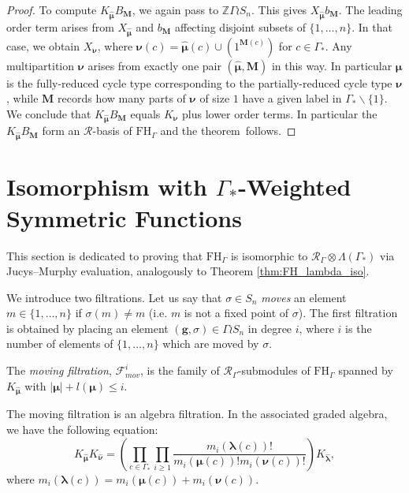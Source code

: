 \documentclass[ALCO,Unicode]{cedram}
\newcommand{\bs}{\boldsymbol}
\newcommand{\RGamma}{\mathcal{R}_{\Gamma}}
\newcommand{\LambdaG}{\Lambda(\Gamma_*)}
\newcommand{\FHG}{\mathrm{FH}_{\Gamma}}
\newcommand{\RGamma}{\mathcal{R}_{\Gamma}}
\newcommand{\LambdaG}{\Lambda(\Gamma_*)}
\newcommand{\FHG}{\mathrm{FH}_{\Gamma}}
\begin{document}
\begin{proof}
To compute $K_{\bm\hat{\bs\mu}}B_{\mathbf{M}}$, we again pass to $\mathbb{Z}\Gamma \wr S_n$. This gives $X_{\bm\hat{\bs\mu}}b_{\mathbf{M}}$. The leading order term arises from $X_{\bm\hat{\bs\mu}}$ and $b_{\mathbf{M}}$ affecting disjoint subsets of $\{1,\ldots, n\}$. In that case, we obtain $X_{\bs \nu}$, where $\bs \nu(c) = \bm \hat{\bs \mu}(c) \cup (1^{\mathbf{M}(c)})$ for $c \in \Gamma_*$. Any multipartition $\bs \nu$ arises from exactly one pair $(\bm\hat{\bs\mu}, \mathbf{M})$ in this way. In particular $\bs \mu$ is the fully-reduced cycle type corresponding to the partially-reduced cycle type $\bs \nu$, while $\mathbf{M}$ records how many parts of $\bs \nu$ of size $1$ have a given label in $\Gamma_*\backslash\{1\}$. We conclude that $K_{\bm\hat{\bs\mu}}B_{\mathbf{M}}$ equals $K_{\bs \nu}$ plus lower order terms. In particular the $K_{\bm\hat{\bs\mu}}B_{\mathbf{M}}$ form an $\mathcal{R}$-basis of $\FHG$ and the theorem~follows.
\end{proof}

\section{Isomorphism with \texorpdfstring{$\Gamma_*$}{Gamma*}-Weighted Symmetric Functions}\label{sec:6}

This section is dedicated to proving that $\FHG$ is isomorphic to $\RGamma \otimes \LambdaG$ via Jucys--Murphy evaluation, analogously to Theorem \ref{thm:FH_lambda_iso}.

We introduce two filtrations. Let us say that $\sigma \in S_n$ \emph{moves} an element $m \in \{1,\ldots, n\}$ if $\sigma(m) \neq m$ (i.e. $m$ is not a fixed point of $\sigma$). The first filtration is obtained by placing an element $(\mathbf{g}, \sigma) \in \Gamma \wr S_n$ in degree $i$, where $i$ is the number of elements of $\{1, \ldots, n\}$ which are moved by $\sigma$. 
\begin{definition}
The \emph{moving filtration}, $\mathcal{F}_{mov}^i$, is the family of $\RGamma$-submodules of $\FHG$ spanned by $K_{\bm\hat{\bs \mu}}$ with $|\bs \mu| + l(\bs \mu) \leq i$.
\end{definition}

\begin{proposition} \label{moving_filt_prop}
The moving filtration is an algebra filtration. In the associated graded algebra, we have the following equation:
\[
K_{\bm\hat{\bs \mu}}K_{\bm\hat{\bs \nu}} = \left( \prod_{c \in \Gamma_*} \prod_{i \geq 1} \frac{m_i(\bs\lambda(c))!}{m_i(\bs\mu(c))!m_i(\bs\nu(c))!}\right) K_{\bm\hat{\bs \lambda}},
\]
where $m_i(\bs\lambda(c)) = m_i(\bs\mu(c)) + m_i(\bs\nu(c))$.
\end{proposition}
\end{document}
